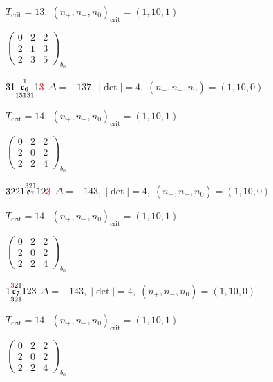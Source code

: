 \documentclass[10pt]{article}
\begin{document}
\hspace{1em}$T_{\text{crit}}=13,\; (n_+,n_-,n_0)_{\text{crit}}=(1,10,1)$

\hspace{2em}$\left(\begin{smallmatrix}0 & 2 & 2 \\ 2 & 1 & 3 \\ 2 & 3 & 5\end{smallmatrix}\right)_{\!b_0}$

\smallskip

$31\overset{1}{\underset{15131}{\mathfrak{e}_6}}1\textcolor{red}{3}$ \quad $\Delta=-137,\; |\det|=4,\; (n_+,n_-,n_0)=(1,10,0)$

\hspace{1em}$T_{\text{crit}}=14,\; (n_+,n_-,n_0)_{\text{crit}}=(1,10,1)$

\hspace{2em}$\left(\begin{smallmatrix}0 & 2 & 2 \\ 2 & 0 & 2 \\ 2 & 2 & 4\end{smallmatrix}\right)_{\!b_0}$

\smallskip

$3221\overset{321}{\mathfrak{e}_7}12\textcolor{red}{3}$ \quad $\Delta=-143,\; |\det|=4,\; (n_+,n_-,n_0)=(1,10,0)$

\hspace{1em}$T_{\text{crit}}=14,\; (n_+,n_-,n_0)_{\text{crit}}=(1,10,1)$

\hspace{2em}$\left(\begin{smallmatrix}0 & 2 & 2 \\ 2 & 0 & 2 \\ 2 & 2 & 4\end{smallmatrix}\right)_{\!b_0}$

\smallskip

$1\overset{\textcolor{red}{3}21}{\underset{321}{\mathfrak{e}_7}}123$ \quad $\Delta=-143,\; |\det|=4,\; (n_+,n_-,n_0)=(1,10,0)$

\hspace{1em}$T_{\text{crit}}=14,\; (n_+,n_-,n_0)_{\text{crit}}=(1,10,1)$

\hspace{2em}$\left(\begin{smallmatrix}0 & 2 & 2 \\ 2 & 0 & 2 \\ 2 & 2 & 4\end{smallmatrix}\right)_{\!b_0}$
\end{document}
